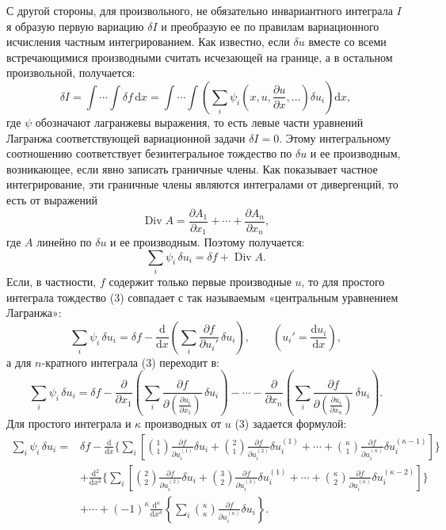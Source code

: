\documentclass[11pt]{article}
\providecommand{\p}{\partial}
\providecommand{\dd}{\mathrm d}
\DeclareMathOperator{\Div}{Div}
\begin{document}
С другой стороны, для произвольного, не обязательно инвариантного интеграла \(I\) я образую первую вариацию \(\delta I\) и преобразую ее по правилам вариационного исчисления частным интегрированием. Как известно, если \(\delta u\) вместе со всеми встречающимися производными считать исчезающей на границе, а в остальном произвольной, получается:
\begin{equation}
\delta I=\int\!\cdots\!\int \delta f\,\dd x
=\int\!\cdots\!\int\left(\sum_i\psi_i\!\left(x,u,\frac{\p u}{\p x},\ldots\right)\delta u_i\right)\dd x,
\tag{2}
\end{equation}
где \(\psi\) обозначают лагранжевы выражения, то есть левые части уравнений Лагранжа соответствующей вариационной задачи \(\delta I=0\). Этому интегральному соотношению соответствует безинтегральное тождество по \(\delta u\) и ее производным, возникающее, если явно записать граничные члены. Как показывает частное интегрирование, эти граничные члены являются интегралами от дивергенций, то есть от выражений
\[
\Div A=\frac{\p A_1}{\p x_1}+\cdots+\frac{\p A_n}{\p x_n},
\]
где \(A\) линейно по \(\delta u\) и ее производным. Поэтому получается:
\begin{equation}
\sum_i\psi_i\,\delta u_i=\delta f+\Div A.
\tag{3}
\end{equation}
Если, в частности, \(f\) содержит только первые производные \(u\), то для простого интеграла тождество (3) совпадает с так называемым «центральным уравнением Лагранжа»:
\begin{equation}
\sum_i \psi_i\,\delta u_i
=\delta f-\frac{\dd}{\dd x}\left(\sum_i\frac{\p f}{\p u_i'}\,\delta u_i\right),
\qquad \left(u_i'=\frac{\dd u_i}{\dd x}\right),
\tag{4}
\end{equation}
а для \(n\)-кратного интеграла (3) переходит в:
\begin{equation}
\sum_i\psi_i\,\delta u_i
=
\delta f
-\frac{\p}{\p x_1}\left(\sum_i\frac{\p f}{\p \left(\frac{\p u_i}{\p x_1}\right)}\,\delta u_i\right)
-\cdots
-\frac{\p}{\p x_n}\left(\sum_i\frac{\p f}{\p \left(\frac{\p u_i}{\p x_n}\right)}\,\delta u_i\right).
\tag{5}
\end{equation}
Для простого интеграла и \(\kappa\) производных от \(u\) (3) задается формулой:
\begin{equation}
\begin{aligned}
\sum_i\psi_i\,\delta u_i
={}&\delta f
-\frac{\dd}{\dd x}\Bigg\{\sum_i\left[
\binom{1}{1}\frac{\p f}{\p u_i^{(1)}}\delta u_i
+\binom{2}{1}\frac{\p f}{\p u_i^{(2)}}\delta u_i^{(1)}
+\cdots+
\binom{\kappa}{1}\frac{\p f}{\p u_i^{(\kappa)}}\delta u_i^{(\kappa-1)}
\right]\Bigg\}\\
&+\frac{\dd^2}{\dd x^2}\Bigg\{\sum_i\left[
\binom{2}{2}\frac{\p f}{\p u_i^{(2)}}\delta u_i
+\binom{3}{2}\frac{\p f}{\p u_i^{(3)}}\delta u_i^{(1)}
+\cdots+
\binom{\kappa}{2}\frac{\p f}{\p u_i^{(\kappa)}}\delta u_i^{(\kappa-2)}
\right]\Bigg\}\\
&+\cdots
+(-1)^\kappa\frac{\dd^\kappa}{\dd x^\kappa}
\left\{\sum_i\binom{\kappa}{\kappa}
\frac{\p f}{\p u_i^{(\kappa)}}\delta u_i\right\}.
\end{aligned}
\tag{6}
\end{equation}
\end{document}
